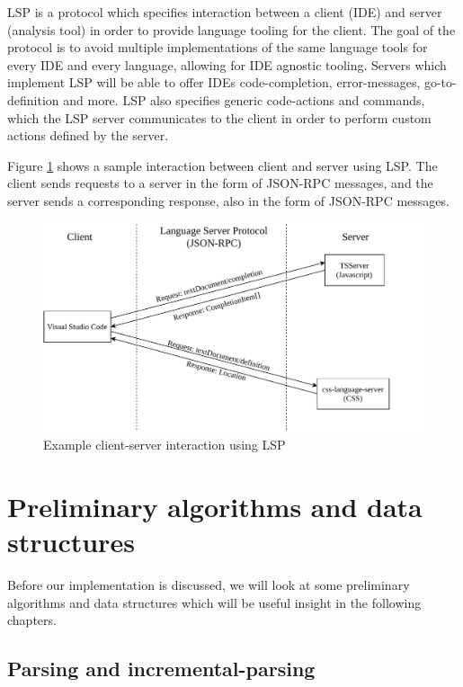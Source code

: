 LSP is a protocol which specifies interaction between a client (IDE) and server (analysis
tool) in order to provide language tooling for the client. The goal of the protocol is to
avoid multiple implementations of the same language tools for every IDE and every
language, allowing for IDE agnostic tooling. Servers which implement LSP will be able to
offer IDEs code-completion, error-messages, go-to-definition and more. LSP also specifies
generic code-actions and commands, which the LSP server communicates to the client in
order to perform custom actions defined by the server.

Figure \ref{fig:lspcommunication} shows a sample interaction between client and server
using LSP. The client sends requests to a server in the form of JSON-RPC messages, and the
server sends a corresponding response, also in the form of JSON-RPC messages.

\begin{figure}[t]
	\includegraphics[width=\textwidth]{figures/lspcommunication.drawio.pdf}
	\caption{Example client-server interaction using LSP}
	\label{fig:lspcommunication}
\end{figure}

\section{Preliminary algorithms and data structures}
\label{prelimalgos}

Before our implementation is discussed, we will look at some preliminary algorithms and
data structures which will be useful insight in the following chapters.

\subsection*{Parsing and incremental-parsing}

